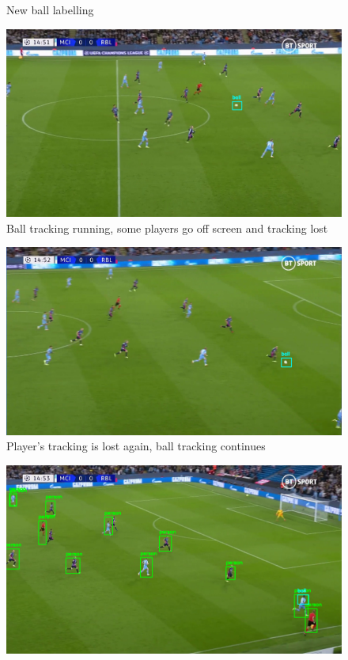 \documentclass[
    11pt,
    oneside
]{report}
\begin{document}
\begin{appendices}
\begin{figure}[H]
    \caption{New ball labelling}
    \label{img:6}
\end{figure}
\begin{figure}[H]
    \includegraphics[keepaspectratio, width=\columnwidth]{Screenshot_2022-03-03_23-05-49.png}
    \caption{Ball tracking running, some players go off screen and tracking lost}
    \label{img:7}
\end{figure}
\begin{figure}[H]
    \includegraphics[keepaspectratio, width=\columnwidth]{Screenshot_2022-03-03_23-06-03.png}
    \caption{Player's tracking is lost again, ball tracking continues}
    \label{img:8}
\end{figure}
\begin{figure}[H]
    \includegraphics[keepaspectratio, width=\columnwidth]{Screenshot_2022-03-03_23-06-18.png}

\end{figure}
\end{appendices}
\end{document}
